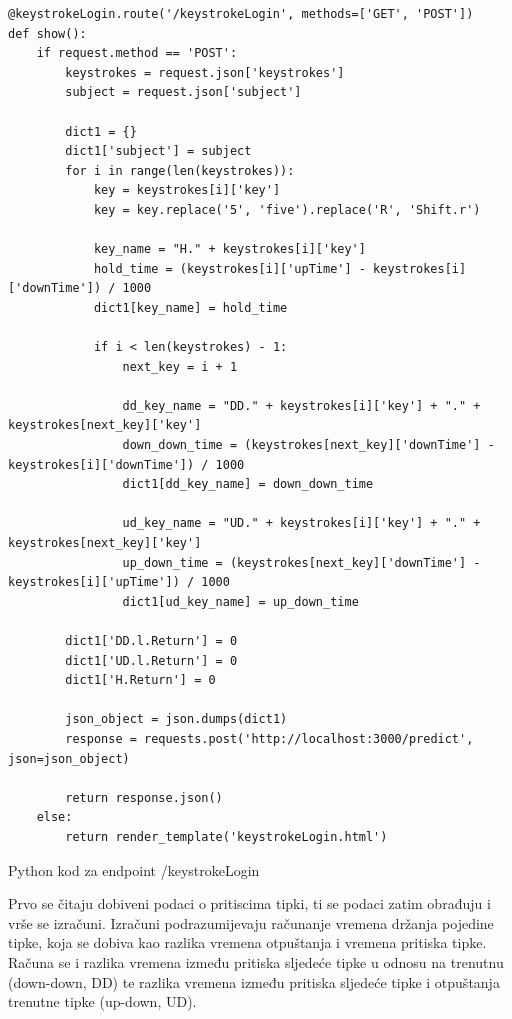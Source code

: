 \documentclass[]{foi}
\begin{document}
\begin{listing}
\begin{verbatim}
@keystrokeLogin.route('/keystrokeLogin', methods=['GET', 'POST'])
def show():
    if request.method == 'POST':
        keystrokes = request.json['keystrokes']
        subject = request.json['subject']

        dict1 = {}
        dict1['subject'] = subject
        for i in range(len(keystrokes)):
            key = keystrokes[i]['key']
            key = key.replace('5', 'five').replace('R', 'Shift.r')

            key_name = "H." + keystrokes[i]['key']
            hold_time = (keystrokes[i]['upTime'] - keystrokes[i]['downTime']) / 1000
            dict1[key_name] = hold_time

            if i < len(keystrokes) - 1:
                next_key = i + 1

                dd_key_name = "DD." + keystrokes[i]['key'] + "." + keystrokes[next_key]['key']
                down_down_time = (keystrokes[next_key]['downTime'] - keystrokes[i]['downTime']) / 1000
                dict1[dd_key_name] = down_down_time

                ud_key_name = "UD." + keystrokes[i]['key'] + "." + keystrokes[next_key]['key']
                up_down_time = (keystrokes[next_key]['downTime'] - keystrokes[i]['upTime']) / 1000
                dict1[ud_key_name] = up_down_time

        dict1['DD.l.Return'] = 0
        dict1['UD.l.Return'] = 0
        dict1['H.Return'] = 0

        json_object = json.dumps(dict1) 
        response = requests.post('http://localhost:3000/predict', json=json_object)

        return response.json()
    else:
        return render_template('keystrokeLogin.html')
\end{verbatim}
\caption{Python kod za endpoint /keystrokeLogin}
\label{lst:python_tipkanje_login}
\end{listing}

Prvo se čitaju dobiveni podaci o pritiscima tipki, ti se podaci zatim obrađuju i vrše se izračuni. Izračuni podrazumijevaju računanje vremena držanja pojedine tipke, koja se dobiva kao razlika vremena otpuštanja i vremena pritiska tipke. Računa se i razlika vremena između pritiska sljedeće tipke u odnosu na trenutnu (down-down, DD) te razlika vremena između pritiska sljedeće tipke i otpuštanja trenutne tipke (up-down, UD). 
\end{document}
